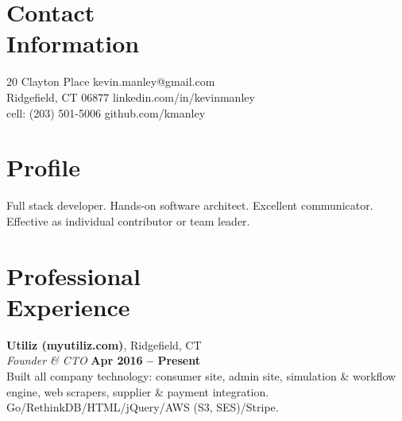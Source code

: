 \documentclass[margin,line]{resume}
\begin{document}
\begin{resume}

    \section{\mysidestyle Contact\\Information}

    20 Clayton Place			                            \hfill kevin.manley@gmail.com       \vspace{0mm}\\\vspace{0mm}%
    Ridgefield, CT 06877                                    \hfill linkedin.com/in/kevinmanley        \vspace{0mm}\\\vspace{0mm}%
    cell: (203) 501-5006 					\hfill github.com/kmanley  \vspace{0mm}\\\vspace{-4.5mm}%


    \section{\mysidestyle Profile}

    Full stack developer. Hands-on software architect. Excellent communicator. Effective as individual contributor or team leader.
    
    \section{\mysidestyle Professional\\Experience}

    \textbf{Utiliz (myutiliz.com)}, Ridgefield, CT\\
    \textsl{Founder \& CTO} \hfill \textbf{Apr 2016 -- Present}\\
    Built all company technology: consumer site, admin site, simulation \& workflow engine, web scrapers, supplier \& payment integration.
    Go/RethinkDB/HTML/jQuery/AWS (S3, SES)/Stripe.


\end{resume}
\end{document}
